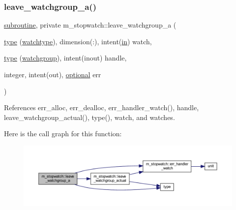 \subsubsection{\texorpdfstring{leave\+\_\+watchgroup\+\_\+a()}{leave\_watchgroup\_a()}}
{\footnotesize\ttfamily \hyperlink{M__stopwatch_83_8txt_acfbcff50169d691ff02d4a123ed70482}{subroutine}, private m\+\_\+stopwatch\+::leave\+\_\+watchgroup\+\_\+a (\begin{DoxyParamCaption}\item[{\hyperlink{stop__watch_83_8txt_a70f0ead91c32e25323c03265aa302c1c}{type} (\hyperlink{structm__stopwatch_1_1watchtype}{watchtype}), dimension(\+:), intent(\hyperlink{M__journal_83_8txt_afce72651d1eed785a2132bee863b2f38}{in})}]{watch,  }\item[{\hyperlink{stop__watch_83_8txt_a70f0ead91c32e25323c03265aa302c1c}{type} (\hyperlink{structm__stopwatch_1_1watchgroup}{watchgroup}), intent(inout)}]{handle,  }\item[{integer, intent(out), \hyperlink{option__stopwatch_83_8txt_aa4ece75e7acf58a4843f70fe18c3ade5}{optional}}]{err }\end{DoxyParamCaption})\hspace{0.3cm}{\ttfamily [private]}}



References err\+\_\+alloc, err\+\_\+dealloc, err\+\_\+handler\+\_\+watch(), handle, leave\+\_\+watchgroup\+\_\+actual(), type(), watch, and watches.

Here is the call graph for this function\+:
\nopagebreak
\begin{figure}[H]
\begin{center}
\leavevmode
\includegraphics[width=350pt]{namespacem__stopwatch_af63fc0f9b537a76feec75584dfa4c95b_cgraph}
\end{center}
\end{figure}
\mbox{\label{namespacem__stopwatch_aafa77066f550b13607b7b8dd970ba1b4}} 
